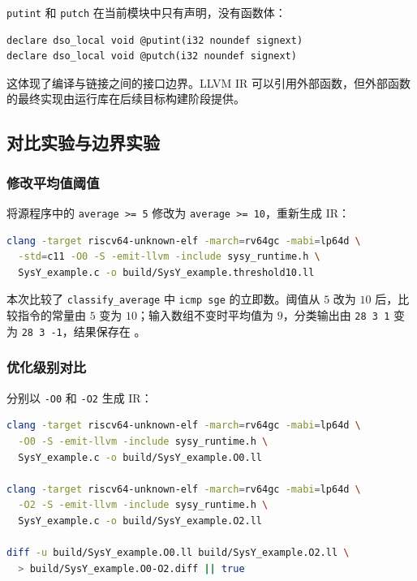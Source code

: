 \documentclass[a4paper]{article}
\begin{document}
\texttt{putint} 和 \texttt{putch} 在当前模块中只有声明，没有函数体：

\begin{lstlisting}[language=LLVMIR,caption={运行库外部声明}]
declare dso_local void @putint(i32 noundef signext)
declare dso_local void @putch(i32 noundef signext)
\end{lstlisting}

这体现了编译与链接之间的接口边界。LLVM IR 可以引用外部函数，但外部函数的最终实现由运行库在后续目标构建阶段提供。

\subsection{对比实验与边界实验}

\subsubsection{修改平均值阈值}

将源程序中的 \texttt{average >= 5} 修改为 \texttt{average >= 10}，重新生成 IR：

\begin{lstlisting}[language=bash,caption={重新生成修改后的 LLVM IR}]
clang -target riscv64-unknown-elf -march=rv64gc -mabi=lp64d \
  -std=c11 -O0 -S -emit-llvm -include sysy_runtime.h \
  SysY_example.c -o build/SysY_example.threshold10.ll
\end{lstlisting}

本次比较了 \texttt{classify\_average} 中 \texttt{icmp sge} 的立即数。阈值从 $5$ 改为 $10$ 后，比较指令的常量由 $5$ 变为 $10$；输入数组不变时平均值为 $9$，分类输出由 \texttt{28 3 1} 变为 \texttt{28 3 -1}，结果保存在 。

\subsubsection{优化级别对比}

分别以 \texttt{-O0} 和 \texttt{-O2} 生成 IR：

\begin{lstlisting}[language=bash,caption={比较不同优化级别的 LLVM IR}]
clang -target riscv64-unknown-elf -march=rv64gc -mabi=lp64d \
  -O0 -S -emit-llvm -include sysy_runtime.h \
  SysY_example.c -o build/SysY_example.O0.ll

clang -target riscv64-unknown-elf -march=rv64gc -mabi=lp64d \
  -O2 -S -emit-llvm -include sysy_runtime.h \
  SysY_example.c -o build/SysY_example.O2.ll

diff -u build/SysY_example.O0.ll build/SysY_example.O2.ll \
  > build/SysY_example.O0-O2.diff || true
\end{lstlisting}
\end{document}
